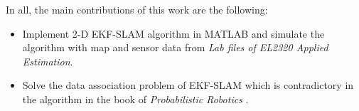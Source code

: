 \documentclass[conference]{IEEEtran}
\begin{document}
\par In all, the main contributions of this work are the  following: 
\begin{itemize}
	\item Implement 2-D EKF-SLAM algorithm in MATLAB and simulate the algorithm with map and sensor data from \textit{Lab files of EL2320 Applied Estimation}.
	\item Solve the data association problem of EKF-SLAM which is contradictory in the algorithm in the book of \textit{Probabilistic Robotics} \cite{Probabilistic_Robotics}.
\end{itemize}

\end{document}
